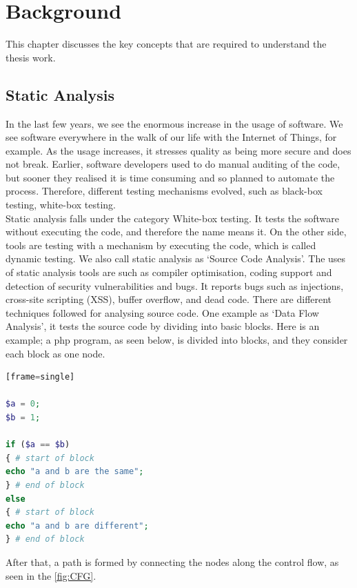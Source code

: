 \chapter{Background}
\label{ch:background_report}

This chapter discusses the key concepts that are required to understand the thesis work.

\section{Static Analysis}

In the last few years, we see the enormous increase in the usage of software. We see software everywhere in the walk of our life with the Internet of Things, for example. As the usage increases, it stresses quality as being more secure and does not break. Earlier, software developers used to do manual auditing of the code, but sooner they realised it is time consuming and so planned to automate the process. Therefore, different testing mechanisms evolved, such as black-box testing, white-box testing. \\

Static analysis falls under the category White-box testing. It tests the software without executing the code, and therefore the name means it. On the other side, tools are testing with a mechanism by executing the code, which is called dynamic testing. We also call static analysis as ‘Source Code Analysis’. The uses of static analysis tools are such as compiler optimisation, coding support and detection of security vulnerabilities and bugs. \cite{deca} It reports bugs such as injections, cross-site scripting (XSS), buffer overflow, and dead code. \cite{bugs} There are different techniques followed for analysing source code. One example as ‘Data Flow Analysis’, it tests the source code by dividing into basic blocks. \cite{Woegerer} Here is an example; a php program, as seen below, is divided into blocks, and they consider each block as one node.

\begin{lstlisting}[showstringspaces=false, language=PHP][frame=single]

$a = 0;
$b = 1;

if ($a == $b)
{ # start of block
echo "a and b are the same";
} # end of block
else
{ # start of block
echo "a and b are different";
} # end of block


\end{lstlisting}

After that, a path is formed by connecting the nodes along the control flow, as seen in the  \autoref{fig:CFG}. \\

